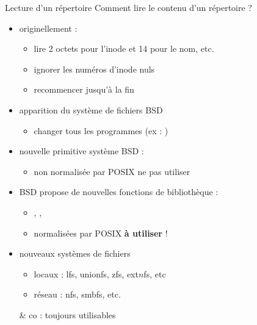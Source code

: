 \begin {frame} {Lecture d'un répertoire}
    Comment lire le contenu d'un répertoire ?

    \begin {itemize}
	\item originellement :  \\
	    \begin {itemize}
		\item lire 2 octets pour l'inode et 14 pour le nom, etc.
		\item ignorer les numéros d'inode nuls
		\item recommencer jusqu'à la fin
	    \end {itemize}

	\item apparition du système de fichiers BSD
	    \begin {itemize}
		\item changer tous les programmes (ex : )
	    \end {itemize}

	\item nouvelle primitive système BSD : 
	    \begin {itemize}
		\item non normalisée par POSIX \implique ne pas utiliser
	    \end {itemize}
	
	\item BSD propose de nouvelles fonctions de bibliothèque :
	    \begin {itemize}
		\item {}, , 
		\item normalisées par POSIX \implique \textbf {à utiliser} !
	    \end {itemize}

	\item nouveaux systèmes de fichiers
	    \begin {itemize}
		\item locaux : lfs, unionfs, zfs, ext$n$fs, etc
		\item réseau : nfs, smbfs, etc.
	    \end {itemize}
	    \implique {} \& co : toujours utilisables
    \end {itemize}
\end {frame}


